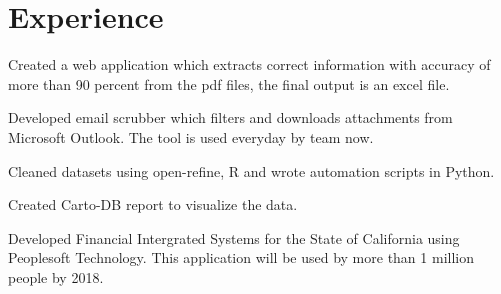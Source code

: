 \documentclass[letterpaper]{deedy-resume} %
\begin{document}
\begin{minipage}[t]{0.66\textwidth} %


\section{Experience}

\vspace{\topsep} %
\begin{tightitemize}
\item Created a web application which extracts correct information with accuracy of more than 90 percent from the pdf files, the final output is an excel file.
\item Developed email scrubber which filters and downloads attachments from Microsoft Outlook. The tool is used everyday by team now.
\end{tightitemize}

\sectionspace %



\begin{tightitemize}
\item Cleaned datasets using open-refine, R and wrote automation scripts in Python.
\item Created Carto-DB report to visualize the data.
\end{tightitemize}

\sectionspace %



\begin{tightitemize}
\item Developed Financial Intergrated Systems for the State of California using Peoplesoft Technology. This application will be used by more than 1 million people by 2018. 
\end{tightitemize}


\end{minipage}
\end{document}
